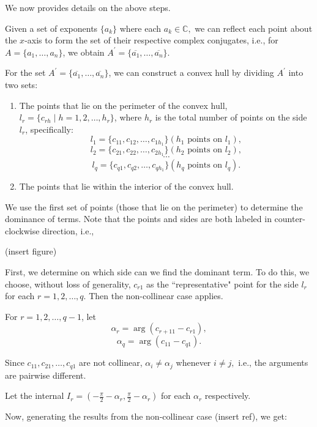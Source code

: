 \documentclass[11pt,reqno,oneside,a4paper]{article}
\begin{document}
We now provides details on the above steps. 

Given a set of exponents $\{a_k\}$ where each $a_k \in \mathbb{C},$ we can reflect each point about the $x$-axis to form the set of their respective complex conjugates, i.e., for $A =\{a_1,\dots,a_n\}$, we obtain $A^\prime = \{\overline{a_1}, \dots, \overline{a_n}\}$. 

For the set $A^\prime = \{\overline{a_1}, \dots, \overline{a_n}\}$, we can construct a convex hull by dividing $A^\prime$ into two sets:

\begin{enumerate}
	\item The points that lie on the perimeter of the convex hull, $l_r = \{c_{rh}\mid h = 1,2,\dots, h_r\}$, where $h_r$ is the total number of points on the side $l_r$, specifically:
	$$l_1 = \{c_{1 1}, c_{1 2}, \dots, c_{1 h_1} \} (h_1 \text{ points on } l_1),$$
	$$l_2 = \{c_{2 1}, c_{2 2}, \dots, c_{2 h_1} \} (h_2 \text{ points on } l_2),$$
	$$\cdots$$
	$$l_q = \{c_{q 1}, c_{q 2}, \dots, c_{q h_1} \} (h_q \text{ points on } l_q).$$
	\item The points that lie within the interior of the convex hull. 
\end{enumerate}

\par We use the first set of points (those that lie on the perimeter) to determine the dominance of terms. Note that the points and sides are both labeled in counter-clockwise direction, i.e.,

(insert figure)

\par First, we determine on which side can we find the dominant term. To do this, we choose, without loss of generality, $c_{r 1}$ as the ``representative" point for the side $l_r$ for each $r=1,2,\dots,q$. Then the non-collinear case applies. 

\par For $r = 1,2,\dots,q-1$, let 
$$\alpha_r = \arg(c_{r+1 1} - c_{r 1}),$$
$$\alpha_q = \arg(c_{1 1} - c_{q 1}).$$

Since $c_{1 1}, c_{2 1}, \dots, c_{q 1}$ are not collinear, $\alpha_i \neq \alpha_j$ whenever $i\neq j,$ i.e., the arguments are pairwise different.  

Let the internal $I_r = \left(-\frac{\pi}{2} - \alpha_r, \frac{\pi}{2} - \alpha_r\right)$ for each $\alpha_r$ respectively. 

Now, generating the results from the non-collinear case (insert ref), we get:
\end{document}
